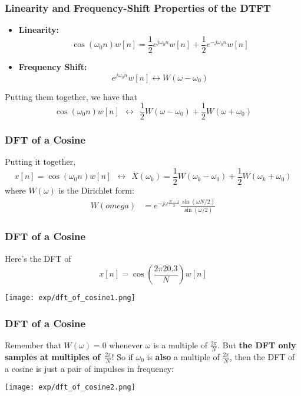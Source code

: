 \documentclass{beamer}
\begin{document}
\begin{frame}
  \frametitle{Linearity and Frequency-Shift Properties of the DTFT}

  \begin{itemize}
  \item {\bf Linearity:}
    \begin{displaymath}
      \cos(\omega_0 n)w[n] = \frac{1}{2}e^{j\omega_0 n}w[n] + \frac{1}{2}e^{-j\omega_0 n}w[n]
    \end{displaymath}
  \item {\bf Frequency Shift:}
    \begin{displaymath}
      e^{j\omega_0 n}w[n] \leftrightarrow W(\omega-\omega_0)
    \end{displaymath}
  \end{itemize}
  Putting them together, we have that
  \begin{displaymath}
    \cos(\omega_0 n)w[n]~~\leftrightarrow~~\frac{1}{2}W(\omega-\omega_0) + \frac{1}{2}W(\omega+\omega_0)
  \end{displaymath}
\end{frame}


\begin{frame}
  \frametitle{DFT of a Cosine}

  Putting it together,
  \begin{displaymath}
    x[n]=\cos(\omega_0 n)w[n] ~~\leftrightarrow~~
    X(\omega_k)=\frac{1}{2}W(\omega_k-\omega_0) + \frac{1}{2}W(\omega_k+\omega_0)
  \end{displaymath}
  where $W(\omega)$ is the Dirichlet form:
  \begin{align*}
    W(omega) &= e^{-j\omega\frac{N-1}{2}}\frac{\sin(\omega N/2)}{\sin(\omega/2)}
  \end{align*}
\end{frame}

\begin{frame}
  \frametitle{DFT of a Cosine}

  Here's the DFT of
  \[
  x[n] = \cos\left(\frac{2\pi 20.3}{N}\right) w[n]
  \]
  
  \centerline{\texttt{[image: exp/dft\_of\_cosine1.png]}}
\end{frame}

\begin{frame}
  \frametitle{DFT of a Cosine}

  Remember that $W(\omega)=0$ whenever $\omega$ is a multiple of
  $\frac{2\pi}{N}$.  But {\bf the DFT only samples at multiples
    of}~$\frac{2\pi}{N}$!  So if $\omega_0$ is {\bf also} a multiple
  of $\frac{2\pi}{N}$, then the DFT of a cosine is just a pair of
  impulses in frequency:
  \centerline{\texttt{[image: exp/dft\_of\_cosine2.png]}}
\end{frame}
\end{document}
